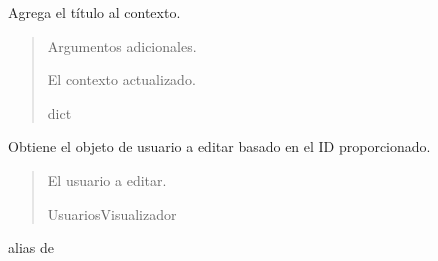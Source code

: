 \documentclass[letterpaper,10pt,spanish]{sphinxmanual}
\begin{document}
\begin{fulllineitems}
\begin{fulllineitems}
\end{fulllineitems}



\begin{fulllineitems}

\pysigstartsignatures
{}
\pysigstopsignatures
\sphinxAtStartPar
Agrega el título al contexto.
\begin{quote}\begin{description}
\sphinxAtStartPar
{} \textendash{} Argumentos adicionales.

\sphinxAtStartPar
El contexto actualizado.

\sphinxAtStartPar
dict

\end{description}\end{quote}

\end{fulllineitems}



\begin{fulllineitems}

\pysigstartsignatures
{}
\pysigstopsignatures
\sphinxAtStartPar
Obtiene el objeto de usuario a editar basado en el ID proporcionado.
\begin{quote}\begin{description}
\sphinxAtStartPar
El usuario a editar.

\sphinxAtStartPar
UsuariosVisualizador

\end{description}\end{quote}

\end{fulllineitems}



\begin{fulllineitems}

\pysigstartsignatures
{}
\pysigstopsignatures
\sphinxAtStartPar
alias de 

\end{fulllineitems}




\end{fulllineitems}
\end{document}
